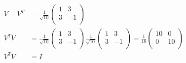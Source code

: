 \documentclass{article}
\begin{document}
\begin{align*}
    V =V^T & =\frac{1}{\sqrt{10}}\begin{pmatrix}1 & 3 \\3 & -1\\\end{pmatrix}                                                                                     \\
    V^T V  & =\frac{1}{\sqrt{10}}\begin{pmatrix}1 & 3 \\3 & -1\\\end{pmatrix}\frac{1}{\sqrt{10}}\begin{pmatrix}1 & 3 \\3 & -1\\\end{pmatrix}=\frac{1}{10}\begin{pmatrix}
        10 & 0 \\0&10\\
    \end{pmatrix} \\
    V^T V  & =I
\end{align*}
\end{document}
